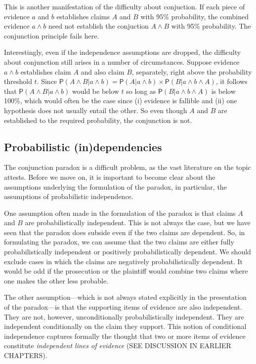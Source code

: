 \documentclass[10pt,dvipsnames,enabledeprecatedfontcommands]{scrartcl}
\newcommand{\et}{\wedge}
\newcommand{\pr}[1]{\mathsf{P}(#1)}
\begin{document}
\noindent This is another manifestation of the difficulty about
conjuction. If each piece of evidence \(a\) and \(b\) establishes claims
\(A\) and \(B\) with 95\% probability, the combined evidence \(a\et b\)
need not establish the conjuction \(A\et B\) with 95\% probability. The
conjunction principle fails here.

Interestingly, even if the independence assumptions are dropped, the
difficulty about conjunction still arises in a number of circumstances.
Suppose evidence \(a\et b\) establishes claim \(A\) and also claim
\(B\), separately, right above the probability threshold \(t\). Since
\(\pr{A \wedge B | a \wedge b} =\pr{A |a \wedge b} \times \pr{B | a \wedge b \wedge A}\),
it follows that \(\pr{A \wedge B | a \wedge b}\) would be below \(t\) so
long as \(\pr{B | a \wedge b \wedge A}\) is below 100\%, which would
often be the case since (i) evidence is fallible and (ii) one hypothesis
does not usually entail the other. So even though \(A\) and \(B\) are
established to the required probability, the conjunction is not.

\hypertarget{probabilistic-independencies}{%
\subsection{Probabilistic
(in)dependencies}\label{probabilistic-independencies}}

The conjunction paradox is a difficult problem, as the vast literature
on the topic attests. Before we move on, it is important to become clear
about the assumptions underlying the formulation of the paradox, in
particular, the assumptions of probabilistic independence.

One assumption often made in the formulation of the paradox is that
claims \(A\) and \(B\) are probabilistically independent. This is not
always the case, but we have seen that the paradox does subside even if
the two claims are dependent. So, in formulating the paradox, we can
assume that the two claims are either fully probabilistically
independent or positively probabilistically dependent. We should exclude
cases in which the claims are negatively probabilistically dependent. It
would be odd if the prosecution or the plaintiff would combine two
claims where one makes the other less probable.

The other assumption---which is not always stated explicitly in the
presentation of the paradox---is that the supporting items of evidence
are also independent. They are not, however, unconditionally
probabilistically independent. They are independent conditionally on the
claim they support. This notion of conditional independence captures
formally the thought that two or more items of evidence constitute
\textit{independent lines of evidence} (SEE DISCUSSION IN EARLIER
CHAPTERS).
\end{document}
